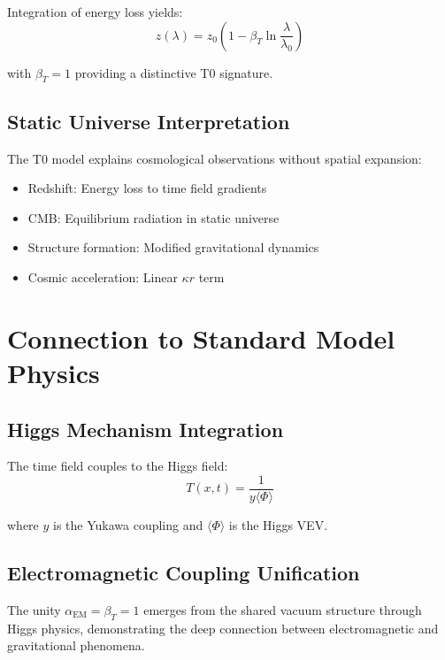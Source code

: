 \documentclass[twocolumn,aps,prl]{revtex4-2}
\newcommand{\Tfieldt}{T(x,t)}
\begin{document}
	Integration of energy loss yields:
	\begin{equation}
		z(\lambda) = z_0\left(1 - \beta_T \ln\frac{\lambda}{\lambda_0}\right)
		\label{eq:wavelength_dependent_redshift}
	\end{equation}
	
	with \(\beta_T = 1\) providing a distinctive T0 signature.
	
	\subsection{Static Universe Interpretation}
	\label{subsec:static_universe}
	
	The T0 model explains cosmological observations without spatial expansion:
	\begin{itemize}
		\item Redshift: Energy loss to time field gradients
		\item CMB: Equilibrium radiation in static universe
		\item Structure formation: Modified gravitational dynamics
		\item Cosmic acceleration: Linear \(\kappa r\) term
	\end{itemize}
	
	\section{Connection to Standard Model Physics}
	\label{sec:standard_model_connection}
	
	\subsection{Higgs Mechanism Integration}
	\label{subsec:higgs_integration}
	
	The time field couples to the Higgs field:
	\begin{equation}
		\Tfieldt = \frac{1}{y\langle\Phi\rangle}
		\label{eq:time_higgs_connection}
	\end{equation}
	
	where \(y\) is the Yukawa coupling and \(\langle\Phi\rangle\) is the Higgs VEV.
	
	\subsection{Electromagnetic Coupling Unification}
	\label{subsec:em_coupling_unification}
	
	The unity \(\alpha_{\text{EM}} = \beta_T = 1\) emerges from the shared vacuum structure through Higgs physics, demonstrating the deep connection between electromagnetic and gravitational phenomena.
	
\end{document}
